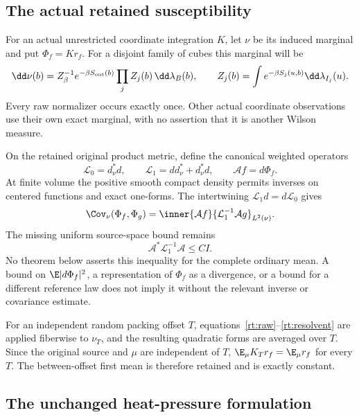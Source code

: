 \subsection{The actual retained susceptibility}

For an actual unrestricted coordinate integration \(K\), let \(\nu\) be its induced marginal and put \(\Phi_f=Kr_f\). For a disjoint family of cubes this marginal will be
\begin{equation}
 \dd\nu(b)=Z_\beta^{-1}e^{-\beta S_{\rm out}(b)}
                 \prod_j Z_j(b)\,\dd\lambda_B(b),\qquad
 Z_j(b)=\int e^{-\beta S_j(u,b)}\dd\lambda_{I_j}(u).
 \label{rt:raw}
\end{equation}
Every raw normalizer occurs exactly once. Other actual coordinate observations use their own exact marginal, with no assertion that it is another Wilson measure.

On the retained original product metric, define the canonical weighted operators
\[
 \mathcal L_0=d_\nu^*d,\qquad
 \mathcal L_1=dd_\nu^*+d_\nu^*d,\qquad
 \mathcal A f=d\Phi_f.
\]
At finite volume the positive smooth compact density permits inverses on centered functions and exact one-forms. The intertwining \(\mathcal L_1d=d\mathcal L_0\) gives
\begin{equation}
 \Cov_\nu(\Phi_f,\Phi_g)
   =\inner{\mathcal Af}{\mathcal L_1^{-1}\mathcal Ag}_{L^2(\nu)} .
 \label{rt:resolvent}
\end{equation}
The missing uniform source-space bound remains
\begin{equation}
 \boxed{\mathcal A^*\mathcal L_1^{-1}\mathcal A\le CI.}
 \label{rt:missing}
\end{equation}
No theorem below asserts this inequality for the complete ordinary mean. A bound on \(\E|d\Phi_f|^2\), a representation of \(\Phi_f\) as a divergence, or a bound for a different reference law does not imply it without the relevant inverse or covariance estimate.

For an independent random packing offset \(T\), equations~\eqref{rt:raw}--\eqref{rt:resolvent} are applied fiberwise to \(\nu_T\), and the resulting quadratic forms are averaged over \(T\). Since the original source and \(\mu\) are independent of \(T\), \(\E_\mu K_T r_f=\E_\mu r_f\) for every \(T\). The between-offset first mean is therefore retained and is exactly constant.

\subsection{The unchanged heat-pressure formulation}

